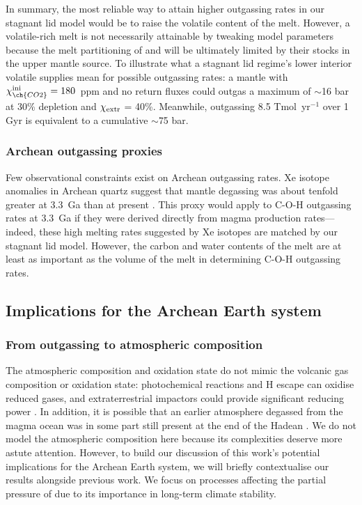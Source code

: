 \vspace{0.4cm}
In summary, the most reliable way to attain higher outgassing rates in our stagnant lid model would be to raise the volatile content of the melt. However, a volatile-rich melt is not necessarily attainable by tweaking model parameters because the melt partitioning of  and  will be ultimately limited by their stocks in the upper mantle source. To illustrate what a stagnant lid regime's lower interior volatile supplies mean for possible outgassing rates: a mantle with $\chi_{\ch{CO2}}^{\rm ini} = 180$~ppm and no return fluxes could outgas a maximum of $\sim$16 bar  at 30\% depletion and $\chi_{\rm extr}$ = 40\%. Meanwhile, outgassing 8.5 Tmol~yr$^{-1}$  \citep{Catling2017} over 1 Gyr is equivalent to a cumulative $\sim$75 bar.




\subsubsection{Archean outgassing proxies}

Few observational constraints exist on Archean outgassing rates. Xe isotope anomalies in Archean quartz suggest that mantle degassing was about tenfold greater at 3.3~Ga than at present \citep{Avice2017, martyGeochemicalEvidenceHigh2019}. This proxy would apply to C-O-H outgassing rates at 3.3~Ga if they were derived directly from magma production rates---indeed, these high melting rates suggested by Xe isotopes are matched by our stagnant lid model. However, the carbon and water contents of the melt are at least as important as the volume of the melt in determining C-O-H outgassing rates. 


\subsection{Implications for the Archean Earth system}\label{sec:implications}

\subsubsection{From outgassing to atmospheric composition}
\label{sec:atmosphere-discussion}

The atmospheric composition and oxidation state do not mimic the volcanic gas composition or  oxidation state: photochemical reactions and H escape can oxidise reduced gases, and extraterrestrial impactors could provide significant reducing power \citep{Zahnle2020}. In addition, it is possible that an earlier atmosphere degassed from the magma ocean was in some part still present at the end of the Hadean \citep{Hamano2013, Nikolaou_2019, Stueken2020}. We do not model the atmospheric composition here because its complexities deserve more astute attention. However, to build our discussion of this work's potential implications for the Archean Earth system, we will briefly contextualise our results alongside previous work. We focus on processes affecting the partial pressure of  due to its importance in long-term climate stability.




